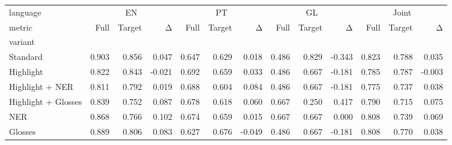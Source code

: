 \begin{tabular}{lrrrrrrrrrrrr}
\toprule
language & \multicolumn{3}{c}{EN} & \multicolumn{3}{c}{PT} & \multicolumn{3}{c}{GL} & \multicolumn{3}{c}{Joint} \\
metric & Full & Target & Δ & Full & Target & Δ & Full & Target & Δ & Full & Target & Δ \\
variant &  &  &  &  &  &  &  &  &  &  &  &  \\
\midrule
Standard & 0.903 & 0.856 & 0.047 & 0.647 & 0.629 & 0.018 & 0.486 & 0.829 & -0.343 & 0.823 & 0.788 & 0.035 \\
Highlight & 0.822 & 0.843 & -0.021 & 0.692 & 0.659 & 0.033 & 0.486 & 0.667 & -0.181 & 0.785 & 0.787 & -0.003 \\
Highlight + NER & 0.811 & 0.792 & 0.019 & 0.688 & 0.604 & 0.084 & 0.486 & 0.667 & -0.181 & 0.775 & 0.737 & 0.038 \\
Highlight + Glosses & 0.839 & 0.752 & 0.087 & 0.678 & 0.618 & 0.060 & 0.667 & 0.250 & 0.417 & 0.790 & 0.715 & 0.075 \\
NER & 0.868 & 0.766 & 0.102 & 0.674 & 0.659 & 0.015 & 0.667 & 0.667 & 0.000 & 0.808 & 0.739 & 0.069 \\
Glosses & 0.889 & 0.806 & 0.083 & 0.627 & 0.676 & -0.049 & 0.486 & 0.667 & -0.181 & 0.808 & 0.770 & 0.038 \\
\bottomrule
\end{tabular}
